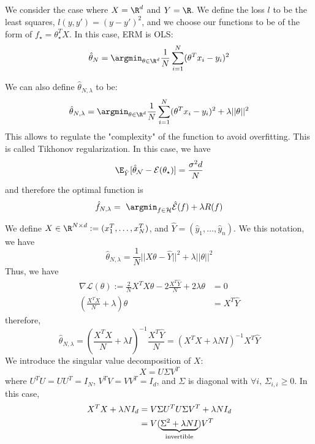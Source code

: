 \documentclass[toc]{../cs-classes/cs-classes}
\begin{document}
\subsection{}
We consider the case where $X=\R^d$ and $Y=\R$. We define the loss $l$ to be the least squares, $l(y, y') = (y-y')^2$, and we choose our functions to be of the form of $f_\star = \theta_\star^T X$. In this case, ERM is OLS:
\begin{equation*}
    \hat{\theta}_N = \argmin_{\theta\in\R^d} \frac{1}{N} \sum_{i=1}^N (\theta^Tx_i-y_i)^2
\end{equation*}

We can also define $\hat{\theta}_{N, \lambda}$ to be:
\begin{equation*}
    \hat{\theta}_{N, \lambda} = \argmin_{\theta\in\R^d} \frac{1}{N} \sum_{i=1}^N (\theta^Tx_i-y_i)^2 + \lambda||\theta||^2
\end{equation*}
This allows to regulate the "complexity" of the function to avoid overfitting. This is called Tikhonov regularization. In this case, we have
\begin{equation*}
    \E_{\hat{Y}}[\mathcal{\hat{\theta}_N} - \mathcal{E}(\theta_\star)] = \frac{\sigma^2 d}{N}
\end{equation*}
and therefore the optimal function is 
\begin{equation*}
    \hat{f}_{N, \lambda} = \argmin_{f\in\mathcal{H}} \hat{\mathcal{E}}(f) + \lambda R(f)
\end{equation*}

We define $X\in\R^{N\times d} := (x_1^T, \dots, x_N^T)$, and $\hat{Y}=(\hat{y}_1, \dots, \hat{y}_n)$. We this notation, we have
\begin{equation*}
    \hat{\theta}_{N, \lambda} = \frac{1}{N}||X\theta-\hat{Y}||^2 + \lambda||\theta||^2
\end{equation*}
Thus, we have
\begin{equation*}
    \begin{aligned}
        \nabla\mathcal{L}(\theta) := \frac{2}{N}X^TX\theta - 2\frac{X^T\hat{Y}}{N}+2\lambda\theta &= 0\\
        (\frac{X^TX}{N}+\lambda)\theta &= X^T\hat{Y}
    \end{aligned}
\end{equation*}
therefore,
\begin{equation*}
    \hat{\theta}_{N, \lambda} = \left(\frac{X^TX}{N}+\lambda I\right)^{-1}\frac{X^T\hat{Y}}{N} = \left(X^TX+\lambda N I\right)^{-1}X^T\hat{Y}
\end{equation*}
We introduce the singular value decomposition of $X$:
\begin{equation*}
    X = U\Sigma V^T
\end{equation*}
where $U^TU = UU^T = I_N$, $V^TV = VV^T=I_d$, and $\Sigma$ is diagonal with $\forall i, \,\Sigma_{i, i} \geq 0$.
In this case,
\begin{equation*}
\begin{aligned}
    X^TX + \lambda NI_d &= V\Sigma U^T U \Sigma V^T + \lambda N I_d\\
    &= V(\underbrace{\Sigma^2 + \lambda N I}_{\textnormal{invertible}}) V^T
\end{aligned}
\end{equation*}
\end{document}
